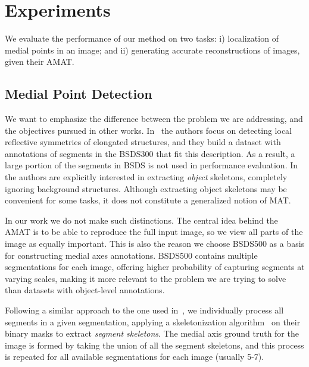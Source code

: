 \documentclass[10pt,twocolumn,letterpaper]{article}
\begin{document}
\section{Experiments}\label{sec:experiments}
We evaluate the performance of our method on two tasks: 
i) localization of medial points in an image; and
ii) generating accurate reconstructions of images, given their AMAT.

\subsection{Medial Point Detection}\label{sec:experiments:detection}
We want to emphasize the difference between the problem we are addressing, and the objectives pursued in other works.
In~\cite{tsogkas2012learning} the authors focus on detecting local reflective symmetries of elongated structures,
and they build a dataset with annotations of segments in the BSDS300 that fit this description.
As a result, a large portion of the segments in BSDS is not used in performance evaluation.
In~\cite{shen2016object} the authors are explicitly interested in extracting \emph{object}
skeletons, completely ignoring background structures.
Although extracting object skeletons may be convenient for some tasks, it does not constitute a generalized
notion of MAT.

In our work we do not make such distinctions. 
The central idea behind the AMAT is to be able to reproduce the full input image,
so we view all parts of the image as equally important.
This is also the reason we choose BSDS500 as a basis for constructing medial axes annotations.
BSDS500 contains multiple segmentations for each image, offering higher probability of
capturing segments at varying scales, making it more relevant to the problem we are trying to solve
than datasets with object-level annotations.

Following a similar approach to the one used in~\cite{tsogkas2012learning}, 
we individually process all segments in a given segmentation, applying a skeletonization 
algorithm~\cite{telea2002augmented} on their binary masks to extract \emph{segment skeletons}.
The medial axis ground truth for the image is formed by taking the union of all the segment skeletons, and this
process is repeated for all available segmentations for each image (usually 5-7).
\end{document}
